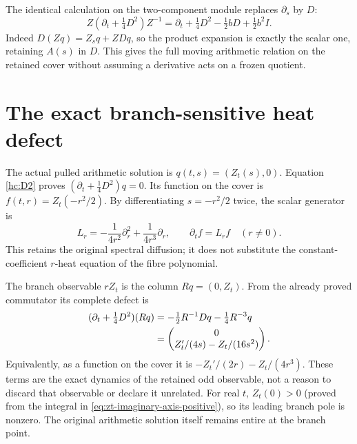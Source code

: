 The identical calculation on the two-component module replaces
$\partial_s$ by $D$:
\begin{equation}
Z(\partial_t+\tfrac14D^2)Z^{-1}
=\partial_t+\tfrac14D^2-\tfrac12 bD+\tfrac12b^2I.
\label{hc:module-gauge}
\end{equation}
Indeed $D(Zq)=Z_s q+ZDq$, so the product expansion is exactly the
scalar one, retaining $A(s)$ in $D$. This gives the full moving
arithmetic relation on the retained cover without assuming a derivative
acts on a frozen quotient.

\section{The exact branch-sensitive heat defect}
The actual pulled arithmetic solution is $q(t,s)=(Z_t(s),0)$.
Equation \eqref{hc:D2} proves
$(\partial_t+\tfrac14D^2)q=0$.
Its function on the cover is $f(t,r)=Z_t(-r^2/2)$.
By differentiating $s=-r^2/2$ twice, the scalar generator is
\begin{equation}
L_r=-\frac1{4r^2}\partial_r^2+\frac1{4r^3}\partial_r,
\qquad \partial_t f=L_rf\quad(r\ne0).
\label{hc:Lr}
\end{equation}
This retains the original spectral diffusion; it does not substitute
the constant-coefficient $r$-heat equation of the fibre polynomial.

The branch observable $rZ_t$ is the column $Rq=(0,Z_t)$.
From the already proved commutator its complete defect is
\begin{align}
(\partial_t+\tfrac14D^2)(Rq)
&=-\tfrac12R^{-1}Dq-\tfrac14R^{-3}q\notag\\
&=\begin{pmatrix}0\\Z_t'/(4s)-Z_t/(16s^2)\end{pmatrix}.
\label{hc:odd-defect}
\end{align}
Equivalently, as a function on the cover it is
$-Z_t'/(2r)-Z_t/(4r^3)$.
These terms are the exact dynamics of the retained odd observable,
not a reason to discard that observable or declare it unrelated.
For real $t$, $Z_t(0)>0$ (proved from the integral in
\eqref{eq:zt-imaginary-axis-positive}), so its leading branch pole is nonzero. The original
arithmetic solution itself remains entire at the branch point.

